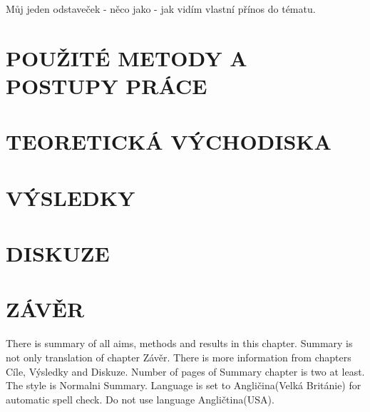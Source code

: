 \documentclass{thesisKGI}
\begin{document}
      Můj jeden odstaveček - něco jako - jak vidím vlastní přínos do tématu. 


    \newpage
    \section{POUŽITÉ METODY A POSTUPY PRÁCE}
      
    
    \newpage
    \section{TEORETICKÁ VÝCHODISKA}
    
    \newpage
    \section{VÝSLEDKY}

    \newpage
    \section{DISKUZE}

    \newpage
    \section{ZÁVĚR}

    \newpage
    

    \begin{summary}
      There is summary of all aims, methods and results in this chapter.
      Summary is not only translation of chapter Závěr. There is more
      information from chapters Cíle, Výsledky and Diskuze. Number of
      pages of Summary chapter is two at least. The style is Normalni
      Summary. Language is set to Angličina(Velká Británie) for automatic
      spell check. Do not use language Angličtina(USA). 
    \end{summary}

  
\end{document}
